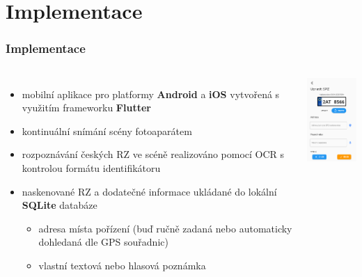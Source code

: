 \documentclass{beamer}
\begin{document}
\section{Implementace}
\begin{frame}
    \frametitle{Implementace}
    \begin{columns}
    \begin{itemize}

        \item mobilní aplikace pro platformy \textbf{Android} a \textbf{iOS} vytvořená s využitím frameworku \textbf{Flutter}
        \item kontinuální snímání scény fotoaparátem
        \item rozpoznávání českých RZ ve scéně realizováno pomocí OCR s kontrolou formátu identifikátoru
        \item naskenované RZ a dodatečné informace ukládané do lokální \textbf{SQLite} databáze
        \begin{itemize}
            \item adresa místa pořízení (buď ručně zadaná nebo automaticky dohledaná dle GPS souřadnic)    
            \item vlastní textová nebo hlasová poznámka
        \end{itemize}
    \end{itemize}
    {\includegraphics[width=2.8cm]{img/screen-preview.png}}

    \end{columns} 
\end{frame}
\end{document}
